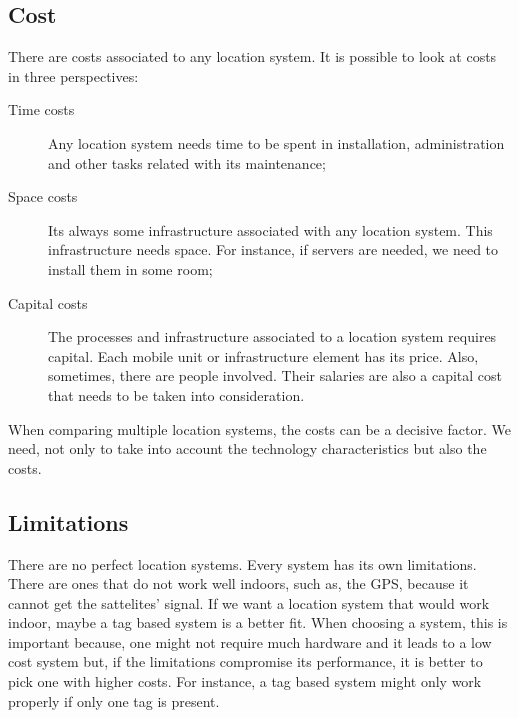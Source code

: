 \subsection{Cost}
\label{sub:background_cost}
There are costs associated to any location system.
It is possible to look at costs in three perspectives:
\begin{description}
  \item[Time costs] Any location system needs time to be spent in installation, administration and other tasks related with its maintenance;
  \item[Space costs] Its always some infrastructure associated with any location system. This infrastructure needs space. For instance, if servers are needed, we need to install them in some room;
  \item[Capital costs] The processes and infrastructure associated to a location system requires capital.
  Each mobile unit or infrastructure element has its price. Also, sometimes, there are people involved. Their salaries are also a capital cost that needs to be taken into consideration.
\end{description}

When comparing multiple location systems, the costs can be a decisive factor. We need, not only to take into account the technology characteristics but also the costs.

\subsection{Limitations}
\label{sub:background_limitations}
There are no perfect location systems. Every system has its own limitations.
There are ones that do not work well indoors, such as, the \gls{GPS}, because it cannot get the sattelites' signal.
If we want a location system that would work indoor, maybe a tag based system is a better fit.
When choosing a system, this is important because, one might not require much hardware and it leads to a low cost system but, if the limitations compromise its performance, it is better to pick one with higher costs.
For instance, a tag based system might only work properly if only one tag is present.

